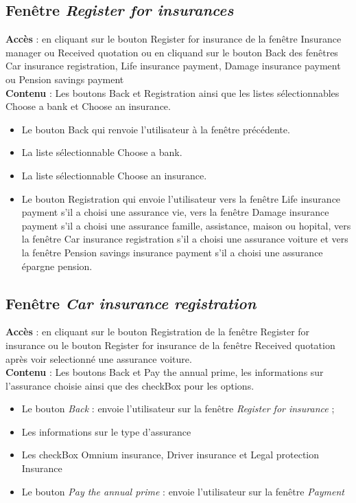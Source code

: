 \documentclass{article}
\newcommand{\navbutton}[2]{Le bouton \emph{#1} : envoie l'utilisateur sur la fenêtre \emph{#2}}
\newcommand{\access}[1]{ \noindent\textbf{Accès} : #1 \\}
\newcommand{\content}[1]{\textbf{Contenu} : #1}
\begin{document}
\subsection{Fenêtre \emph{Register for insurances}}
\access{en cliquant sur le bouton Register for insurance de la fenêtre Insurance manager ou Received quotation ou en cliquand sur le bouton Back des fenêtres Car insurance registration, Life insurance payment, Damage insurance payment ou Pension savings payment}
\content{Les boutons Back et Registration ainsi que les listes sélectionnables Choose a bank et Choose an insurance.}
\begin{itemize}
\item Le bouton Back qui renvoie l'utilisateur à la fenêtre précédente.
\item La liste sélectionnable Choose a bank.
\item La liste sélectionnable Choose an insurance.
\item Le bouton Registration qui envoie l'utilisateur vers la fenêtre Life insurance payment s'il a choisi une assurance vie, vers la fenêtre Damage insurance payment s'il a choisi une assurance famille, assistance, maison ou hopital, vers la fenêtre Car insurance registration s'il a choisi une assurance voiture et vers la fenêtre Pension savings insurance payment s'il a choisi une assurance épargne pension.
\end{itemize}


\subsection{Fenêtre \emph{Car insurance registration}}
\access{en cliquant sur le bouton Registration de la fenêtre Register for insurance ou le bouton Register for insurance de la fenêtre Received quotation après voir selectionné une assurance voiture.}
\content{Les boutons Back et Pay the annual prime, les informations sur l'assurance choisie ainsi que des checkBox pour les options.}
\begin{itemize}
\item \navbutton{Back}{Register for insurance} ;
\item Les informations sur le type d'assurance
\item Les checkBox Omnium insurance, Driver insurance et Legal protection Insurance
\item \navbutton{Pay the annual prime}{Payment}
\end{itemize}
\end{document}
